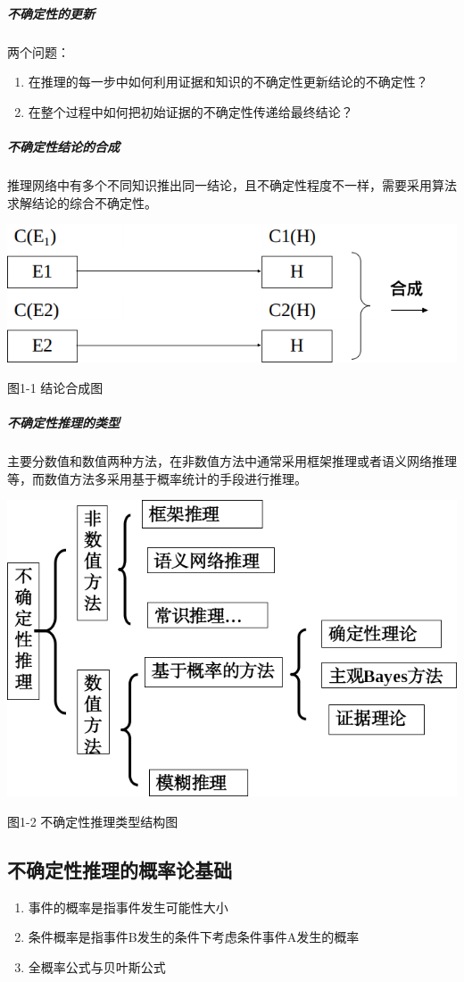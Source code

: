 \documentclass[12pt]{article}
\begin{document}
\subparagraph{不确定性的更新}
两个问题：
\begin{enumerate}
	\item{在推理的每一步中如何利用证据和知识的不确定性更新结论的不确定性？}
	\item{在整个过程中如何把初始证据的不确定性传递给最终结论？}
\end{enumerate}
\subparagraph{不确定性结论的合成}
推理网络中有多个不同知识推出同一结论，且不确定性程度不一样，需要采用算法求解结论的综合不确定性。
\par
\centerline{
	\includegraphics[scale=0.5]{flowchart1.png}
}
\centerline{图1-1 结论合成图}
\par
\subparagraph{不确定性推理的类型}
主要分数值和数值两种方法，在非数值方法中通常采用框架推理或者语义网络推理等，而数值方法多采用基于概率统计的手段进行推理。
\par
\centerline{
	\includegraphics[scale=0.5]{flowchart2.png}
}
\centerline{图1-2 不确定性推理类型结构图}
\par
\subsection{不确定性推理的概率论基础}
\begin{enumerate}
	\item{事件的概率是指事件发生可能性大小}
	\item{条件概率是指事件B发生的条件下考虑条件事件A发生的概率}
	\item{全概率公式与贝叶斯公式}
\end{enumerate}
\end{document}
